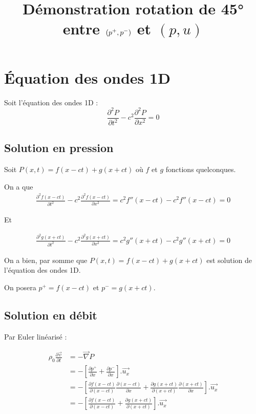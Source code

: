 \documentclass{article}
\title{Démonstration rotation de 45° entre $(\pplus,\pmoins)$ et $(p,u)$ }
\author{}
\date{}
\let\oldsection\section
\renewcommand{\section}[1]{\oldsection*{#1}}
\let\oldsubsection\subsection
\renewcommand{\subsection}[1]{\oldsubsection*{\hspace{1em}#1}}
\newcommand{\pplus}{p^{+}}
\newcommand{\pmoins}{p^{-}}
\begin{document}
\maketitle

\section{Équation des ondes 1D}

Soit l'équation des ondes 1D : 
\begin{equation*}
	\frac{\partial^2 P}{\partial t^2} - c^2 \frac{\partial^2 P}{\partial x^2} = 0
\end{equation*}

\subsection{Solution en pression}
Soit $P(x,t) = f(x-ct) + g(x+ct)$ où $f$ et $g$ fonctions quelconques.

On a que 
\begin{align*}
	\frac{\partial^2 f(x-ct)}{\partial t^2} - c^2 \frac{\partial^2 f(x-ct)}{\partial x^2} = c^2 f''(x-ct) - c^2 f''(x-ct) = 0
\end{align*}

Et

\begin{align*}
	\frac{\partial^2 g(x+ct)}{\partial t^2} - c^2 \frac{\partial^2 g(x+ct)}{\partial x^2} = c^2 g''(x+ct) - c^2 g''(x+ct) = 0
\end{align*}

On a bien, par somme que $P(x,t) = f(x-ct) + g(x+ct)$ est solution de l'équation des ondes 1D.

On posera $\pplus = f(x-ct)$ et $\pmoins = g(x+ct)$.

\subsection{Solution en débit}
Par Euler linéarisé :

\begin{align*}
	\rho_0 \frac{\partial \vec{v}}{\partial t} 
	& = -\vec{\nabla}{P} \\
	& = - \left[\frac{\partial \pplus}{\partial x} + \frac{\partial \pmoins}{\partial x}\right].\vec{u_x} \\
	& = - \left[\frac{\partial f(x-ct)}{\partial (x-ct)} \frac{\partial (x-ct)}{\partial x} + 
				\frac{\partial g(x+ct)}{\partial (x+ct)} \frac{\partial (x+ct)}{\partial x} \right].\vec{u_x} \\
	& = - \left[\frac{\partial f(x-ct)}{\partial (x-ct)} + \frac{\partial g(x+ct)}{\partial (x+ct)} \right].\vec{u_x}
\end{align*}
\end{document}

